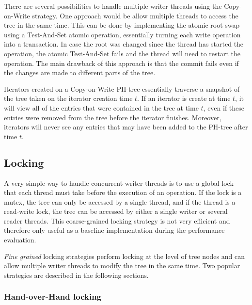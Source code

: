 \documentclass[11pt,a4paper]{globis-book}
\begin{document}
There are several possibilities to handle multiple writer threads using the Copy-on-Write strategy. One approach would be allow multiple threads to access the tree in the same time. This can be done by implementing the atomic root swap using a Test-And-Set atomic operation, essentially turning each write operation into a transaction. In case the root was changed since the thread has started the operation, the atomic Test-And-Set fails and the thread will need to restart the operation. The main drawback of this approach is that the commit fails even if the changes are made to different parts of the tree.

Iterators created on a Copy-on-Write PH-tree essentially traverse a snapshot of the tree taken on the iterator creation time $t$. If an iterator is create at time $t$, it will view all of the entries that were contained in the tree at time $t$, even if these entries were removed from the tree before the iterator finishes. Moreover, iterators will never see any entries that may have been added to the PH-tree after time $t$.

\subsection{Locking}

A very simple way to handle concurrent writer threads is to use a global lock that each thread must take before the execution of an operation. If the lock is a mutex, the tree can only be accessed by a single thread, and if the thread is a read-write lock, the tree can be accessed by either a single writer or several reader threads. This coarse-grained locking strategy is not very efficient and therefore only useful as a baseline implementation during the performance evaluation.

\textit{Fine grained} locking strategies perform locking at the level of tree nodes and can allow multiple writer threads to modify the tree in the same time. Two popular strategies are described in the following sections.  

\subsubsection{Hand-over-Hand locking}
\end{document}
